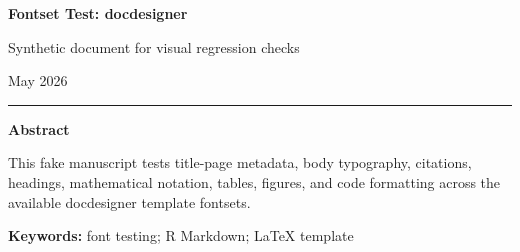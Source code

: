 \documentclass[12pt]{article}
\newif\ifdocdesigneranon
\begin{document}
\begin{titlepage}
\thispagestyle{empty}
\vspace*{0.12\textheight}
\begin{center}
\begin{singlespace}

{\LARGE\bfseries Fontset Test: docdesigner\par}

\vspace{0.35em}
{\large Synthetic document for visual regression checks\par}

\vspace{2.2em}

\docdesignerauthorblock

\par\vspace{1.5\baselineskip}
\docdesignerseriesblock

\ifdocdesigneranon\else
\vspace{0.35em}
{\small May 2026}\par
\fi

\vspace{2.2\baselineskip}
\noindent\rule{0.35\textwidth}{0.4pt}\par
\vspace{0.65em}
\begin{minipage}{0.78\textwidth}
\small\singlespacing
\textbf{Abstract}\par\vspace{0.3em}
This fake manuscript tests title-page metadata, body typography,
citations, headings, mathematical notation, tables, figures, and code
formatting across the available docdesigner template fontsets.
\par\vspace{0.6em}
\textbf{Keywords:} font testing; R Markdown; LaTeX template
\end{minipage}

\end{singlespace}
\end{center}
\vfill
\end{titlepage}
\else
\end{document}
